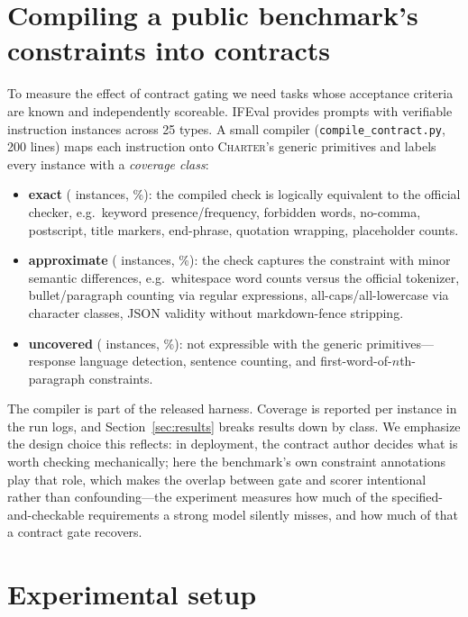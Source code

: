 \documentclass{article}
\begin{document}
\section{Compiling a public benchmark's constraints into contracts}
\label{sec:compile}

To measure the effect of contract gating we need tasks whose acceptance criteria
are known and independently scoreable. IFEval provides \NPrompts{} prompts with
\NInstrInstances{} verifiable instruction instances across 25 types. A small
compiler (\texttt{compile\_contract.py}, 200 lines) maps each instruction onto
\textsc{Charter}'s generic primitives and labels every instance with a
\emph{coverage class}:

\begin{itemize}
  \item \textbf{exact} (\ExactN{} instances, \ExactPct\%): the compiled check is
  logically equivalent to the official checker, e.g.\ keyword presence/frequency,
  forbidden words, no-comma, postscript, title markers, end-phrase, quotation
  wrapping, placeholder counts.
  \item \textbf{approximate} (\ApproxN{} instances, \ApproxPct\%): the check
  captures the constraint with minor semantic differences, e.g.\ whitespace word
  counts versus the official tokenizer, bullet/paragraph counting via regular
  expressions, all-caps/all-lowercase via character classes, JSON validity
  without markdown-fence stripping.
  \item \textbf{uncovered} (\UncoveredN{} instances, \UncoveredPct\%): not
  expressible with the generic primitives---response language detection, sentence
  counting, and first-word-of-$n$th-paragraph constraints.
\end{itemize}

The compiler is part of the released harness. Coverage is reported per instance
in the run logs, and Section~\ref{sec:results} breaks results down by class. We
emphasize the design choice this reflects: in deployment, the contract author
decides what is worth checking mechanically; here the benchmark's own constraint
annotations play that role, which makes the overlap between gate and scorer
intentional rather than confounding---the experiment measures how much of the
specified-and-checkable requirements a strong model silently misses, and how much
of that a contract gate recovers.

\section{Experimental setup}
\label{sec:setup}
\end{document}
